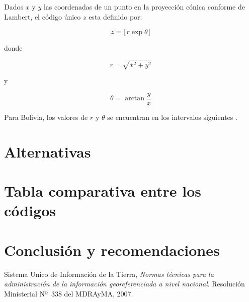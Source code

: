 \documentclass[letterpaper]{article}
\begin{document}
Dados \(x\) y \(y\) las coordenadas de un punto en la proyección cónica conforme de Lambert, el código único \(z\) esta definido por:

\[z = \lfloor r \exp{\theta} \rfloor\]

donde

\[r = \sqrt{x^2+y^2} \]

y

\[\theta = \arctan{\frac{y}{x}} \]


Para Bolivia, los valores de \(r\) y \(\theta\) se encuentran en los intervalos siguientes \cite{lesage14a}.



\section{Alternativas}

\section{Tabla comparativa entre los códigos}

\section{Conclusión y recomendaciones}

\begin{thebibliography}{99}

  Sistema Unico de Información de la Tierra,
  \emph{Normas técnicas para la administración de la información georeferenciada a nivel nacional}.
  Resolución Ministerial Nº~338 del MDRAyMA,
  2007.

\end{thebibliography}
\end{document}
